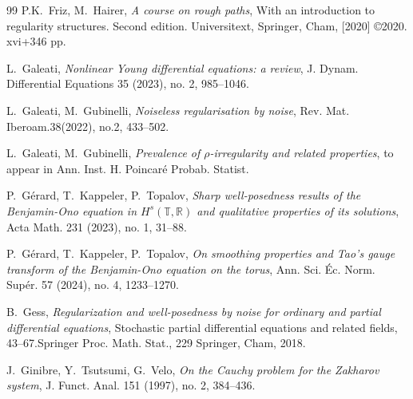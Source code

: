 \documentclass[letterpaper, 11pt,  reqno]{amsart}
\newcommand{\1}{\hspace{0.5mm}\text{I}\hspace{0.5mm}}
\newcommand{\R}{\mathbb{R}}
\newcommand{\T}{\mathbb{T}}
\numberwithin{equation}{section}
\numberwithin{theorem}{section}
\begin{document}
\begin{thebibliography}{99}
P.K.~Friz,  M.~Hairer, 
{\it A course on rough paths}, 
With an introduction to regularity structures. Second edition.
Universitext, Springer, Cham, [2020] \copyright 2020. xvi+346 pp.



%
%


L.~Galeati, 
{\it Nonlinear {Y}oung differential equations: a review}, 
J. Dynam. Differential Equations 35 (2023), no. 2, 985--1046.



L.~Galeati, M.~Gubinelli,
{\it Noiseless regularisation by noise}, 
Rev. Mat. Iberoam.38(2022), no.2, 433--502.




L.~Galeati, M.~Gubinelli,
{\it  Prevalence of $\rho$-irregularity and related properties},
to appear in Ann. Inst. H. Poincar\'e Probab. Statist.


%
%
%



P.~G\'erard, T.~Kappeler, P.~Topalov,
{\it  Sharp well-posedness results of the Benjamin-Ono equation in $H^s(\T, \R)$  and qualitative properties of its solutions}, 
Acta Math. 231 (2023), no. 1,  31--88.



P.~G\'erard, T.~Kappeler, P.~Topalov,
{\it On smoothing properties and Tao's gauge transform of the Benjamin-Ono equation on the torus},
 Ann. Sci. \'Ec. Norm. Sup\'er.  57 (2024), no. 4, 1233--1270.



B.~Gess, 
{\it Regularization and well-posedness by noise for ordinary and partial differential equations},
 Stochastic partial differential equations and related fields, 43--67.Springer Proc. Math. Stat., 229
Springer, Cham, 2018.




J.~Ginibre, Y.~Tsutsumi, G.~Velo, 
{\it On the Cauchy problem for the Zakharov system}, 
J. Funct. Anal. 151 (1997), no. 2, 384--436.

%
%


\end{thebibliography}
\end{document}
